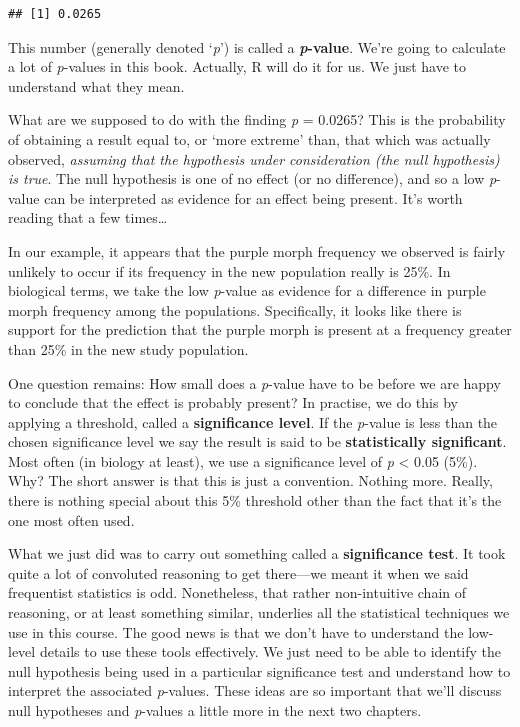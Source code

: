 \documentclass[]{book}
\begin{document}
\begin{verbatim}
## [1] 0.0265
\end{verbatim}

This number (generally denoted `\emph{p}') is called a
\textbf{\emph{p}-value}. We're going to calculate a lot of
\emph{p}-values in this book. Actually, R will do it for us. We just
have to understand what they mean.

What are we supposed to do with the finding \emph{p} = 0.0265? This is
the probability of obtaining a result equal to, or `more extreme' than,
that which was actually observed, \emph{assuming that the hypothesis
under consideration (the null hypothesis) is true}. The null hypothesis
is one of no effect (or no difference), and so a low \emph{p}-value can
be interpreted as evidence for an effect being present. It's worth
reading that a few times\ldots{}

In our example, it appears that the purple morph frequency we observed
is fairly unlikely to occur if its frequency in the new population
really is 25\%. In biological terms, we take the low \emph{p}-value as
evidence for a difference in purple morph frequency among the
populations. Specifically, it looks like there is support for the
prediction that the purple morph is present at a frequency greater than
25\% in the new study population.

One question remains: How small does a \emph{p}-value have to be before
we are happy to conclude that the effect is probably present? In
practise, we do this by applying a threshold, called a
\textbf{significance level}. If the \emph{p}-value is less than the
chosen significance level we say the result is said to be
\textbf{statistically significant}. Most often (in biology at least), we
use a significance level of \emph{p} \textless{} 0.05 (5\%). Why? The
short answer is that this is just a convention. Nothing more. Really,
there is nothing special about this 5\% threshold other than the fact
that it's the one most often used.

What we just did was to carry out something called a
\textbf{significance test}. It took quite a lot of convoluted reasoning
to get there---we meant it when we said frequentist statistics is odd.
Nonetheless, that rather non-intuitive chain of reasoning, or at least
something similar, underlies all the statistical techniques we use in
this course. The good news is that we don't have to understand the
low-level details to use these tools effectively. We just need to be
able to identify the null hypothesis being used in a particular
significance test and understand how to interpret the associated
\emph{p}-values. These ideas are so important that we'll discuss null
hypotheses and \emph{p}-values a little more in the next two chapters.
\end{document}
